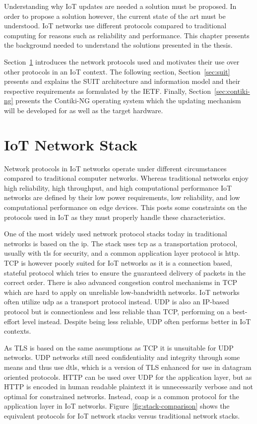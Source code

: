 \documentclass[0-thesis.tex]{subfiles}
\begin{document}
Understanding why IoT updates are needed a solution must be proposed. In order to propose
a solution however, the current state of the art must be understood. IoT networks use
different protocols compared to traditional computing for reasons such as reliability and
performance. This chapter presents the background needed to understand the solutions
presented in the thesis. 

Section~\ref{sec:network} introduces the network protocols used and motivates their use
over other protocols in an IoT context. The following section, Section~\ref{sec:suit}
presents and explains the SUIT architecture and information model and their respective
requirements as formulated by the IETF. Finally, Section~\ref{sec:contiki-ng} presents the
Contiki-NG operating system which the updating mechanism will be developed for as well as
the target hardware.

\section{IoT Network Stack}
\label{sec:network}
Network protocols in IoT networks operate under different circumstances compared to
traditional computer networks. Whereas traditional networks enjoy high reliability, high
throughput, and high computational performance IoT networks are defined by their low power
requirements, low reliability, and low computational performance on edge devices. This
posts some constraints on the protocols used in IoT as they must properly handle these
characteristics.

One of the most widely used network protocol stacks today in traditional networks is based
on the \gls{ip}. The stack uses \gls{tcp} as a transportation protocol, usually with
\gls{tls} for security, and a common application layer protocol is \gls{http}. TCP is
however poorly suited for IoT networks as it is a connection based, stateful protocol
which tries to ensure the guaranteed delivery of packets in the correct order. There is
also advanced congestion control mechanisms in TCP which are hard to apply on unreliable
low-bandwidth networks. IoT networks often utilize \gls{udp} as a transport protocol
instead. UDP is also an IP-based protocol but is connectionless and less reliable than
TCP, performing on a best-effort level instead. Despite being less reliable, UDP often
performs better in IoT contexts.

As TLS is based on the same assumptions as TCP it is unsuitable for UDP networks. UDP
networks still need confidentiality and integrity through some means and thus use
\gls{dtls}, which is a version of TLS enhanced for use in datagram oriented protocols.
HTTP can be used over UDP for the application layer, but as HTTP is encoded in human
readable plaintext it is unnecessarily verbose and not optimal for constrained networks.
Instead, \gls{coap} is a common protocol for the application layer in IoT networks.
Figure~\ref{fig:stack-comparison} shows the equivalent protocols for IoT network stacks
versus traditional network stacks. 
\end{document}
